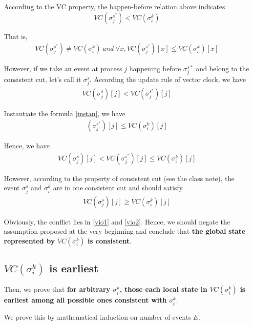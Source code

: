\documentclass[11pt,a4paper]{article}
\begin{document}
    According to the VC property, the happen-before relation above indicates
    $$ VC(\sigma_j^{s^*}) < VC(\sigma_i^{k})$$

    That is,
    \begin{align}
    VC(\sigma_j^{s^*}) \neq VC(\sigma_i^{k}) \ and \ \forall x,
    VC(\sigma_j^{s^*})[x] \leq VC(\sigma_i^{k})[x]  \label{instan}
    \end{align}

    However, if we take an event at process $j$ happening before
    $\sigma_j^{s*}$ and belong to the consistent cut, let's call it
    $\sigma_j^s$. According the update rule of vector clock, we have
    \begin{align}
    VC(\sigma_j^s)[j] < VC(\sigma_j^{s^*})[j]
    \end{align}

    Instantiate the formula \eqref{instan}, we have
    \begin{align}
        (\sigma_j^{s^*})[j] \leq VC(\sigma_i^{k})[j]
    \end{align}

    Hence, we have 
    \begin{align} \label{vio1}
    VC(\sigma_j^s)[j] < VC(\sigma_j^{s^*})[j] \leq VC(\sigma_i^{k})[j]
    \end{align}

    However, according to the property of consistent cut (see the class note),
    the event $\sigma_j^s$ and $\sigma_i^{k}$ are in one consistent cut and
    should satisfy
    \begin{align} \label{vio2}
     VC (\sigma_j^s)[j] \geq VC (\sigma_i^{k})[j] 
    \end{align}

    Obviously, the conflict lies in \eqref{vio1} and \eqref{vio2}. Hence, we
    should negate the assumption proposed at the very beginning and conclude
    that \textbf{the global state represented by $VC(\sigma_i^k)$ is
        consistent}.

\newpage

\subsection{$VC(\sigma_i^k)$ is earliest}
Then, we prove that 
    \textbf{for arbitrary $\sigma_i^k$, those each local state in
        $VC(\sigma_i^k)$ is earliest among all possible ones consistent with
        $\sigma_i^k$}.

    We prove this by mathematical induction on number of events $E$. 
\end{document}
